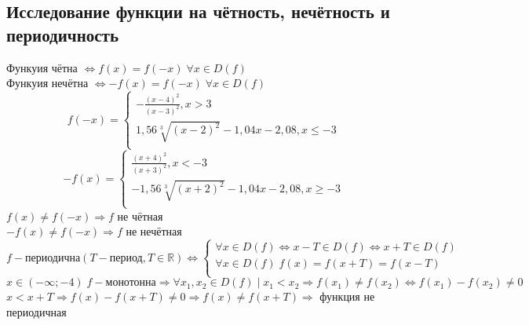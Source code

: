 \documentclass{article}
\begin{document}
    \subsection{Исследование функции на чётность, нечётность и периодичность}
    Функуия чётна $\iff f(x) = f(-x)\; \forall x \in D(f)$ \\
    Функуия нечётна $\iff -f(x) = f(-x)\; \forall x \in D(f)$ \\
    \begin{equation*}
    f(-x) = 
    \begin{cases}
        - \frac{(x-4)^2}{(x-3)^2}, x > 3 \\
        1,56 \sqrt[3]{(x-2)^2} - 1,04 x - 2,08, x \leq -3 \\
    \end{cases}
    \end{equation*}
    \begin{equation*}
    -f(x) = 
    \begin{cases}
        \frac{(x+4)^2}{(x+3)^2}, x < -3 \\
        -1,56 \sqrt[3]{(x+2)^2} - 1,04 x - 2,08, x \geq -3 \\
    \end{cases}
    \end{equation*}
    $f(x) \neq f(-x) \Rightarrow f$ не чётная \\
    $-f(x) \neq f(-x) \Rightarrow f$ не нечётная \\

    \begin{equation*}
    f - \text{периодична} (T - \text{период}, T \in \mathbb{R}) \iff 
    \begin{cases}
        \forall x \in D(f) \iff x - T \in D(f) \iff x + T \in D(f) \\
        \forall x \in D(f) \; f(x) = f(x+T) = f(x-T) \\
    \end{cases}
    \end{equation*}
    $x \in (- \infty;-4) \; f - \text{монотонна} \Rightarrow \forall x_1, x_2 \in D(f) \; | \; x_1 < x_2 \Rightarrow f(x_1) \neq f(x_2) \iff f(x_1) - f(x_2) \neq 0$ \\
    $x < x + T \Rightarrow f(x) - f(x+T) \neq 0 \Rightarrow f(x) \neq f(x+T) \Rightarrow$ функция не периодичная
    
\end{document}
